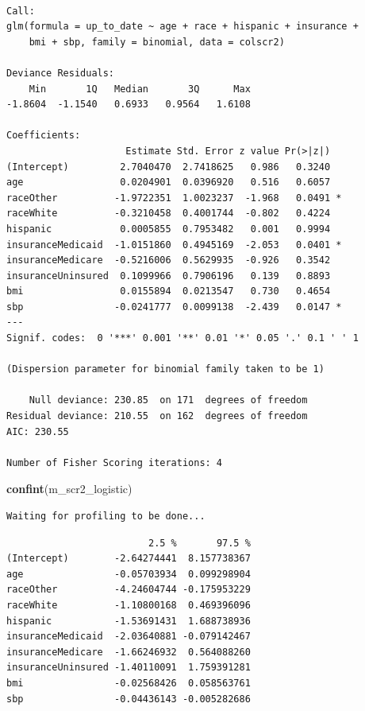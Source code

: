\documentclass[]{book}
\newenvironment{Shaded}{\begin{snugshade}}{\end{snugshade}}
\newcommand{\KeywordTok}[1]{\textcolor[rgb]{0.13,0.29,0.53}{\textbf{#1}}}
\newcommand{\NormalTok}[1]{#1}
\theoremstyle{definition}
\theoremstyle{definition}
\theoremstyle{definition}
\theoremstyle{remark}
\begin{document}
\begin{verbatim}

Call:
glm(formula = up_to_date ~ age + race + hispanic + insurance + 
    bmi + sbp, family = binomial, data = colscr2)

Deviance Residuals: 
    Min       1Q   Median       3Q      Max  
-1.8604  -1.1540   0.6933   0.9564   1.6108  

Coefficients:
                     Estimate Std. Error z value Pr(>|z|)  
(Intercept)         2.7040470  2.7418625   0.986   0.3240  
age                 0.0204901  0.0396920   0.516   0.6057  
raceOther          -1.9722351  1.0023237  -1.968   0.0491 *
raceWhite          -0.3210458  0.4001744  -0.802   0.4224  
hispanic            0.0005855  0.7953482   0.001   0.9994  
insuranceMedicaid  -1.0151860  0.4945169  -2.053   0.0401 *
insuranceMedicare  -0.5216006  0.5629935  -0.926   0.3542  
insuranceUninsured  0.1099966  0.7906196   0.139   0.8893  
bmi                 0.0155894  0.0213547   0.730   0.4654  
sbp                -0.0241777  0.0099138  -2.439   0.0147 *
---
Signif. codes:  0 '***' 0.001 '**' 0.01 '*' 0.05 '.' 0.1 ' ' 1

(Dispersion parameter for binomial family taken to be 1)

    Null deviance: 230.85  on 171  degrees of freedom
Residual deviance: 210.55  on 162  degrees of freedom
AIC: 230.55

Number of Fisher Scoring iterations: 4
\end{verbatim}

\begin{Shaded}
\begin{Highlighting}[]
\KeywordTok{confint}\NormalTok{(m_scr2_logistic)}
\end{Highlighting}
\end{Shaded}

\begin{verbatim}
Waiting for profiling to be done...
\end{verbatim}

\begin{verbatim}
                         2.5 %       97.5 %
(Intercept)        -2.64274441  8.157738367
age                -0.05703934  0.099298904
raceOther          -4.24604744 -0.175953229
raceWhite          -1.10800168  0.469396096
hispanic           -1.53691431  1.688738936
insuranceMedicaid  -2.03640881 -0.079142467
insuranceMedicare  -1.66246932  0.564088260
insuranceUninsured -1.40110091  1.759391281
bmi                -0.02568426  0.058563761
sbp                -0.04436143 -0.005282686
\end{verbatim}
\end{document}

